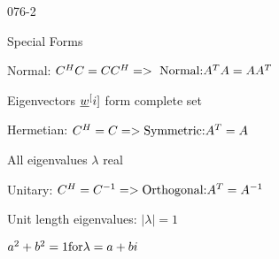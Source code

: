 \begin{mitframe}{076-2}
\begin{listone}
\item Special Forms
	\begin{listtwo}
    \item Normal: $\conc^{\enthalpy}\conc=\conc\conc^{\enthalpy}=> \textnormal{ Normal:} \helmholtz^{\Temp}\helmholtz=\helmholtz\helmholtz^{\Temp}$
    	\begin{listthree}
        	\item Eigenvectors $\vort^[\state]$ form complete set
            \item Hermetian: $\conc^{\enthalpy}=\conc=>\textnormal{Symmetric:} \helmholtz^{\Temp}=\helmholtz$
            \begin{listfour}
            	\item All eigenvalues $\lambda$ real
            \end{listfour}
        \item Unitary: $\conc^{\enthalpy}=\conc^{-1}=>\textnormal{Orthogonal:}\helmholtz^{\Temp}=\helmholtz^{-1}$
        	\begin{listfour}
            	\item Unit length eigenvalues: $|\lambda|=1$
                	\begin{listfive}
                    \item $\activity^2+b^2=1 \textnormal{for} \lambda=\activity+b\state$
            	\end{listfive}
            \end{listfour}
        \end{listthree}
    \end{listtwo}
\end{listone}        
\end{mitframe}